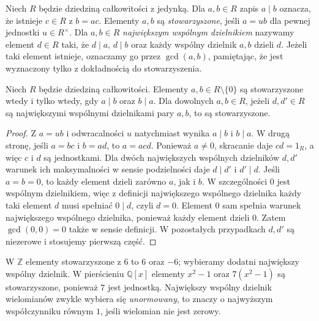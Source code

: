\begin{definicja}
\label{aa:def:divides-associates}
Niech $R$ będzie dziedziną całkowitości z jedynką.
Dla $a,b\in R$ zapis $a\mid b$ oznacza, że istnieje
$c\in R$ z $b=ac$. Elementy $a,b$ są \emph{stowarzyszone},
jeśli $a=ub$ dla pewnej jednostki $u\in R^\times$.
Dla $a,b\in R$ \emph{największym wspólnym dzielnikiem}
nazywamy element $d\in R$ taki, że $d\mid a$, $d\mid b$
oraz każdy wspólny dzielnik $a,b$ dzieli $d$.
Jeżeli taki element istnieje, oznaczamy go przez
$\gcd(a,b)$, pamiętając, że jest wyznaczony tylko
z dokładnością do stowarzyszenia.
\end{definicja}
\begin{lemat}
\label{aa:lem:gcd-unique}
Niech $R$ będzie dziedziną całkowitości. Elementy
$a,b\in R\setminus\{0\}$ są stowarzyszone wtedy i tylko
wtedy, gdy $a\mid b$ oraz $b\mid a$.
Dla dowolnych $a,b\in R$, jeżeli $d,d'\in R$ są największymi
wspólnymi dzielnikami pary $a,b$, to są stowarzyszone.
\end{lemat}
\begin{proof}
Z $a=ub$ i odwracalności $u$ natychmiast wynika
$a\mid b$ i $b\mid a$. W drugą stronę, jeśli $a=bc$
i $b=ad$, to $a=acd$. Ponieważ $a\ne0$, skracanie
daje $cd=1_R$, a więc $c$ i $d$ są jednostkami.
Dla dwóch największych wspólnych dzielników $d,d'$
warunek ich maksymalności w sensie podzielności
daje $d\mid d'$ i $d'\mid d$. Jeśli $a=b=0$, to każdy element dzieli zarówno $a$, jak i $b$.
W szczególności $0$ jest wspólnym dzielnikiem, więc z definicji
największego wspólnego dzielnika każdy taki element $d$ musi
spełniać $0\mid d$, czyli $d=0$. Element $0$ sam spełnia
warunek największego wspólnego dzielnika, ponieważ każdy element
dzieli $0$. Zatem $\gcd(0,0)=0$ także w sensie definicji.
W pozostałych przypadkach $d,d'$ są niezerowe i stosujemy
pierwszą część.
\end{proof}

\begin{przyklad}
\label{aa:prz:units-gcd}
W $\mathbb Z$ elementy stowarzyszone z $6$ to $6$ oraz $-6$;
wybieramy dodatni największy wspólny dzielnik.
W pierścieniu $\mathbb Q[x]$ elementy $x^2-1$ oraz
$7(x^2-1)$ są stowarzyszone, ponieważ $7$ jest jednostką.
Największy wspólny dzielnik wielomianów zwykle wybiera się
\emph{unormowany}, to znaczy o najwyższym współczynniku
równym $1$, jeśli wielomian nie jest zerowy.
\end{przyklad}

